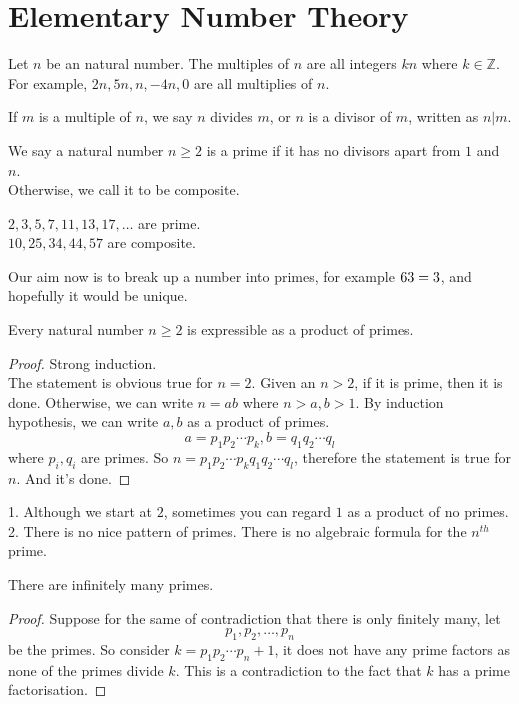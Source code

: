 \section{Elementary Number Theory}
Let $n$ be an natural number.
The multiples of $n$ are all integers $kn$ where $k\in\mathbb Z$.
For example, $2n,5n,n,-4n,0$ are all multiplies of $n$.
\begin{definition}
    If $m$ is a multiple of $n$, we say $n$ divides $m$, or $n$ is a divisor of $m$, written as $n|m$.
\end{definition}
\begin{definition}
    We say a natural number $n\ge 2$ is a prime if it has no divisors apart from $1$ and $n$.\\
    Otherwise, we call it to be composite.
\end{definition}
\begin{example}
    $2,3,5,7,11,13,17,\ldots$ are prime.\\
    $10,25,34,44,57$ are composite.
\end{example}
Our aim now is to break up a number into primes, for example $63=3\time 3\time 7$, and hopefully it would be unique.
\begin{proposition}
    Every natural number $n\ge 2$ is expressible as a product of primes.
\end{proposition}
\begin{proof}
    Strong induction.\\
    The statement is obvious true for $n=2$.
    Given an $n>2$, if it is prime, then it is done.
    Otherwise, we can write $n=ab$ where $n>a,b>1$.
    By induction hypothesis, we can write $a,b$ as a product of primes.
    $$a=p_1p_2\cdots p_k, b=q_1q_2\cdots q_l$$
    where $p_i,q_i$ are primes.
    So $n=p_1p_2\cdots p_kq_1q_2\cdots q_l$, therefore the statement is true for $n$.
    And it's done.
\end{proof}
\begin{remark}
    1. Although we start at $2$, sometimes you can regard $1$ as a product of no primes.\\
    2. There is no nice pattern of primes.
    There is no algebraic formula for the $n^{th}$ prime.
\end{remark}
\begin{theorem}
    There are infinitely many primes.
\end{theorem}
\begin{proof}
    Suppose for the same of contradiction that there is only finitely many, let
    $$p_1,p_2,\ldots, p_n$$
    be the primes.
    So consider $k=p_1p_2\cdots p_n+1$, it does not have any prime factors as none of the primes divide $k$.
    This is a contradiction to the fact that $k$ has a prime factorisation.
\end{proof}
